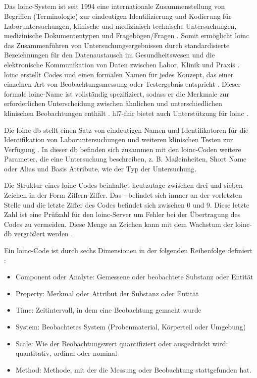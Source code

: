 \subsection{} \label{subsec:loinc}

Das \acf{loinc}-System ist seit 1994 eine internationale Zusammenstellung von Begriffen (Terminologie) zur eindeutigen Identifizierung und Kodierung für Laboruntersuchungen, klinische und medizinisch-technische Untersuchungen, medizinische Dokumententypen und Fragebögen/Fragen \cite{loincbfarm, loincpaper}. Somit ermöglicht \ac{loinc} das Zusammenführen von Untersuchungsergebnissen durch standardisierte Bezeichnungen für den Datenaustausch im Gesundheitswesen und die elektronische Kommunikation von Daten zwischen Labor, Klinik und Praxis \cite{interop}. \ac{loinc} erstellt Codes und einen formalen Namen für jedes Konzept, das einer einzelnen Art von Beobachtungsmessung oder Testergebnis entspricht \cite{interop}. Dieser formale \ac{loinc}-Name ist vollständig spezifiziert, sodass er die Merkmale zur erforderlichen Unterscheidung zwischen ähnlichen und unterschiedlichen klinischen Beobachtungen enthält \cite{telemedizin}. \ac{hl7}-\ac{fhir} bietet auch Unterstützung für \ac{loinc} \cite{loincpaper}.

Die \ac{loinc}-\ac{db} stellt einen Satz von eindeutigen Namen und Identifikatoren für die Identifikation von Laboruntersuchungen und weiteren klinischen Testen zur Verfügung \cite{loincbas}. In dieser \ac{db} befinden sich zusammen mit den \ac{loinc}-Coden weitere Parameter, die eine Untersuchung beschreiben, z. B. Maßeinheiten, \glqq Short Name\grqq{} oder Alias und Basis Attribute, wie der Typ der Untersuchung.

Die Struktur eines \ac{loinc}-Codes beinhaltet heutzutage zwischen drei und sieben Zeichen in der Form \glqq Ziffern-Ziffer\grqq{}. Das \glqq-\grqq{} befindet sich immer an der vorletzten Stelle und die letzte Ziffer des Codes befindet sich zwischen 0 und 9. Diese letzte Zahl ist eine Prüfzahl für den \ac{loinc}-Server um Fehler bei der Übertragung des Codes zu vermeiden. Diese Menge an Zeichen kann mit dem Wachstum der \ac{loinc}-\ac{db} vergrößert werden \cite{loincoffi}.

Ein \ac{loinc}-Code ist durch sechs Dimensionen in der folgenden Reihenfolge definiert \cite{loincbfarm}: 
\begin{itemize}
	\item Component oder Analyte: Gemessene oder beobachtete Substanz oder Entität
	\item Property: Merkmal oder Attribut der Substanz oder Entität
	\item Time: Zeitintervall, in dem eine Beobachtung gemacht wurde
	\item System: Beobachtetes System (Probenmaterial, Körperteil oder Umgebung)
	\item Scale: Wie der Beobachtungswert quantifiziert oder ausgedrückt wird: quantitativ, ordinal oder nominal
	\item Method: Methode, mit der die Messung oder Beobachtung stattgefunden hat.
\end{itemize}

